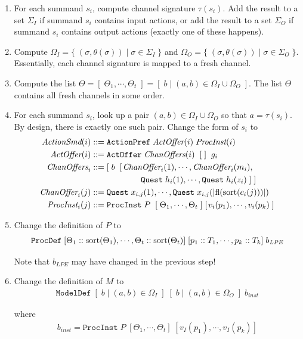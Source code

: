 \begin{enumerate}
\item For each summand $s_i$, compute channel signature $\tau(s_i)$.
Add the result to a set $\Sigma_I$ if summand $s_i$ contains input actions, or add the result to a set $\Sigma_O$ if summand $s_i$ contains output actions (exactly one of these happens).

\item Compute $\Omega_I = \{ \; (\sigma, \theta(\sigma)) \;|\; \sigma \in \Sigma_I \; \}$ and $\Omega_O = \{ \; (\sigma, \theta(\sigma)) \;|\; \sigma \in \Sigma_O \; \}$.
Essentially, each channel signature is mapped to a fresh channel.

\item Compute the list $\Theta = [ \; \Theta_1, \cdots{}, \Theta_t \; ] = [ \; b \;|\; (a, b) \in \Omega_I \cup \Omega_O \; ]$.
The list $\Theta$ contains all fresh channels in some order.

\item For each summand $s_i$, look up a pair $(a, b) \in \Omega_I \cup \Omega_O$ so that $a = \tau(s_i)$.
By design, there is exactly one such pair.
Change the form of $s_i$ to
\begin{align*}
\textit{ActionSmd}(i) &::= \texttt{ActionPref} \; \textit{ActOffer}(i) \; \textit{ProcInst}(i) \\
\textit{ActOffer}(i) &::= \texttt{ActOffer} \; \textit{ChanOffers}(i) \;\; [ \; ] \;\; g_i \\
\textit{ChanOffers}_i &::= [ \; b \;\; [ \;\! \textit{ChanOffer}_i(1), \cdots{}, \textit{ChanOffer}_i(m_i), \\
&\qquad \qquad \qquad \texttt{Quest} \; h_i(1), \cdots{}, \texttt{Quest} \; h_i(z_i) \; ] \; ] \\
\textit{ChanOffer}_i(j) &::= \texttt{Quest} \; x_{i,j}(1), \cdots{}, \texttt{Quest} \; x_{i,j}(|\text{fl}(\text{sort}(c_i(j)))|) \\
\textit{ProcInst}_i(j) &::= \texttt{ProcInst} \; P \; \; [ \; \Theta_1, \cdots{}, \Theta_t \; ] \; [\;\!v_i(p_1), \cdots{}, v_i(p_k) \; ]
\end{align*}

\item Change the definition of $P$ to
\begin{align*}
\texttt{ProcDef} \; [\Theta_1 :: \text{sort}(\Theta_1), \cdots{}, \Theta_t :: \text{sort}(\Theta_t)] \; [p_1 :: T_1, \cdots{}, p_k :: T_k] \; b_\textit{LPE}
\end{align*}

Note that $b_\textit{LPE}$ may have changed in the previous step!

\item Change the definition of $M$ to
\begin{align*}
\texttt{ModelDef} \; [ \; b \;|\; (a, b) \in \Omega_I \; ] \; [ \; b \;|\; (a, b) \in \Omega_O \; ] \; b_\textit{inst}
\end{align*}

where
\begin{align*}
b_\textit{inst} = \texttt{ProcInst} \; P \; [\Theta_1, \cdots{}, \Theta_t] \; [v_I(p_1), \cdots{}, v_I(p_k)]
\end{align*}
\end{enumerate}

